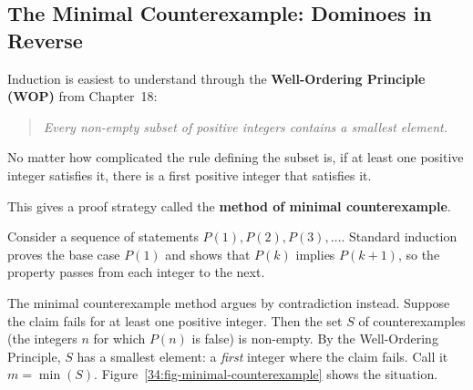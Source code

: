 \subsection{The Minimal Counterexample: Dominoes in Reverse}

Induction is easiest to understand through the \textbf{Well-Ordering Principle (WOP)} from Chapter~18:
\begin{quote}
\emph{Every non-empty subset of positive integers contains a smallest element.}
\end{quote}
No matter how complicated the rule defining the subset is, if at least one positive integer satisfies it, there is a first positive integer that satisfies it.

This gives a proof strategy called the \textbf{method of minimal counterexample}.

Consider a sequence of statements $P(1), P(2), P(3), \dots$. Standard induction proves the base case $P(1)$ and shows that $P(k)$ implies $P(k+1)$, so the property passes from each integer to the next.

The minimal counterexample method argues by contradiction instead. Suppose the claim fails for at least one positive integer. Then the set $S$ of counterexamples (the integers $n$ for which $P(n)$ is false) is non-empty. By the Well-Ordering Principle, $S$ has a smallest element: a \emph{first} integer where the claim fails. Call it $m = \min(S)$. Figure~\ref{34:fig-minimal-counterexample} shows the situation.

